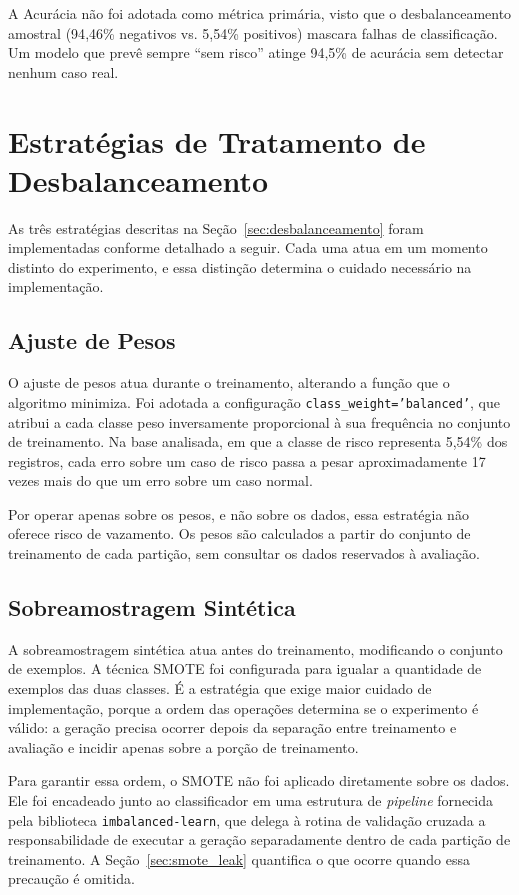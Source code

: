 A Acurácia não foi adotada como métrica primária, visto que o desbalanceamento amostral (94{,}46\% negativos vs. 5{,}54\% positivos) mascara falhas de classificação. Um modelo que prevê sempre ``sem risco'' atinge 94{,}5\% de acurácia sem detectar nenhum caso real.

\section{Estratégias de Tratamento de Desbalanceamento}
\label{sec:estrategias}

As três estratégias descritas na Seção~\ref{sec:desbalanceamento} foram implementadas conforme detalhado a seguir. Cada uma atua em um momento distinto do experimento, e essa distinção determina o cuidado necessário na implementação.

\subsection{Ajuste de Pesos}

O ajuste de pesos atua durante o treinamento, alterando a função que o algoritmo minimiza. Foi adotada a configuração \texttt{class\_weight='balanced'}, que atribui a cada classe peso inversamente proporcional à sua frequência no conjunto de treinamento. Na base analisada, em que a classe de risco representa 5{,}54\% dos registros, cada erro sobre um caso de risco passa a pesar aproximadamente 17 vezes mais do que um erro sobre um caso normal.

Por operar apenas sobre os pesos, e não sobre os dados, essa estratégia não oferece risco de vazamento. Os pesos são calculados a partir do conjunto de treinamento de cada partição, sem consultar os dados reservados à avaliação.

\subsection{Sobreamostragem Sintética}

A sobreamostragem sintética atua antes do treinamento, modificando o conjunto de exemplos. A técnica SMOTE foi configurada para igualar a quantidade de exemplos das duas classes. É a estratégia que exige maior cuidado de implementação, porque a ordem das operações determina se o experimento é válido: a geração precisa ocorrer depois da separação entre treinamento e avaliação e incidir apenas sobre a porção de treinamento.

Para garantir essa ordem, o SMOTE não foi aplicado diretamente sobre os dados. Ele foi encadeado junto ao classificador em uma estrutura de \textit{pipeline} fornecida pela biblioteca \texttt{imbalanced-learn}, que delega à rotina de validação cruzada a responsabilidade de executar a geração separadamente dentro de cada partição de treinamento. A Seção~\ref{sec:smote_leak} quantifica o que ocorre quando essa precaução é omitida.

